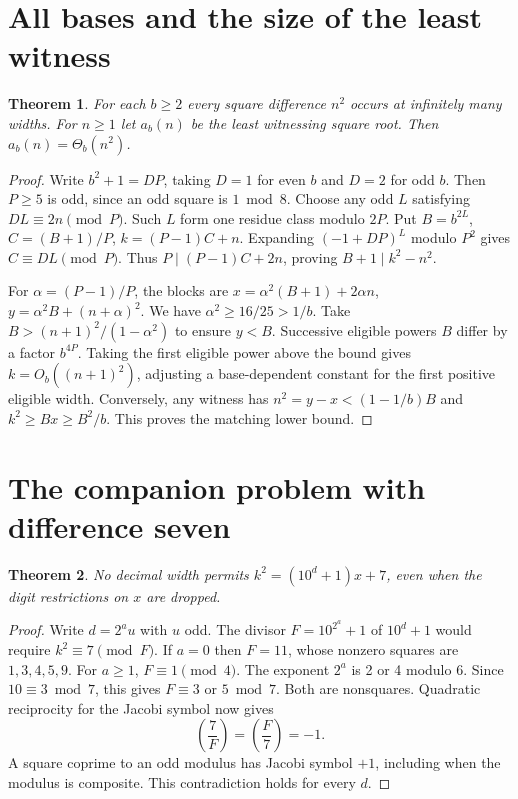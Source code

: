 \documentclass[11pt,letterpaper]{article}
\newtheorem{theorem}{Theorem}
\begin{document}
\section{All bases and the size of the least witness}
\begin{theorem}\label{th:bases}
For each \(b\ge2\) every square difference \(n^2\) occurs at infinitely many widths. For \(n\ge1\) let \(a_b(n)\) be the least witnessing square root. Then \(a_b(n)=\Theta_b(n^2)\).
\end{theorem}
\begin{proof}
Write \(b^2+1=D P\), taking \(D=1\) for even \(b\) and \(D=2\) for odd \(b\). Then \(P\ge5\) is odd, since an odd square is \(1\bmod 8\). Choose any odd \(L\) satisfying \(D L\equiv2n\pmod P\). Such \(L\) form one residue class modulo \(2P\). Put \(B=b^{2L}\), \(C=(B+1)/P\), \(k=(P-1)C+n\). Expanding \((-1+DP)^L\) modulo \(P^2\) gives \(C\equiv DL\pmod P\). Thus \(P\mid(P-1)C+2n\), proving \(B+1\mid k^2-n^2\).

For \(\alpha=(P-1)/P\), the blocks are \(x=\alpha^2(B+1)+2\alpha n\), \(y=\alpha^2B+(n+\alpha)^2\). We have \(\alpha^2\ge16/25>1/b\). Take \(B>(n+1)^2/(1-\alpha^2)\) to ensure \(y<B\). Successive eligible powers \(B\) differ by a factor \(b^{4P}\). Taking the first eligible power above the bound gives \(k=O_b((n+1)^2)\), adjusting a base-dependent constant for the first positive eligible width. Conversely, any witness has \(n^2=y-x<(1-1/b)B\) and \(k^2\ge Bx\ge B^2/b\). This proves the matching lower bound.
\end{proof}

\section{The companion problem with difference seven}
\begin{theorem}
No decimal width permits \(k^2=(10^d+1)x+7\), even when the digit restrictions on \(x\) are dropped.
\end{theorem}
\begin{proof}
Write \(d=2^a u\) with \(u\) odd. The divisor \(F=10^{2^a}+1\) of \(10^d+1\) would require \(k^2\equiv7\pmod F\). If \(a=0\) then \(F=11\), whose nonzero squares are \(1,3,4,5,9\). For \(a\ge1\), \(F\equiv1\pmod4\). The exponent \(2^a\) is 2 or 4 modulo 6. Since \(10\equiv3\bmod7\), this gives \(F\equiv3\) or \(5\bmod7\). Both are nonsquares. Quadratic reciprocity for the Jacobi symbol now gives
\[
                    \left(\frac7F\right)=\left(\frac F7\right)=-1.
\]
A square coprime to an odd modulus has Jacobi symbol \(+1\), including when the modulus is composite. This contradiction holds for every \(d\).
\end{proof}
\end{document}
